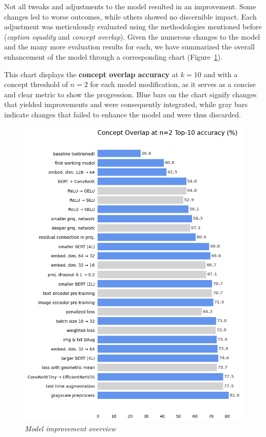 \documentclass[10pt,twocolumn,letterpaper]{article}
\begin{document}
Not all tweaks and adjustments to the model resulted in an improvement. Some changes led to worse outcomes, while others showed no discernible impact. Each adjustment was meticulously evaluated using the methodologies mentioned before (\textit{caption equality} and \textit{concept overlap}). Given the numerous changes to the model and the many more evaluation results for each, we have summarized the overall enhancement of the model through a corresponding chart (Figure\ \ref{fig:imprp}).

This chart displays the \textbf{concept overlap accuracy} at $k=10$ and with a concept threshold of $n=2$ for each model modification, as it serves as a concise and clear metric to show the progression. Blue bars on the chart signify changes that yielded improvements and were consequently integrated, while gray bars indicate changes that failed to enhance the model and were thus discarded.

\begin{figure}[h]
   \centering
   \includegraphics[width=0.8\linewidth]{img/Improvement_Plot.png}
   \caption{\textit{Model improvement overview}}
   \label{fig:imprp}
\end{figure}
\end{document}
